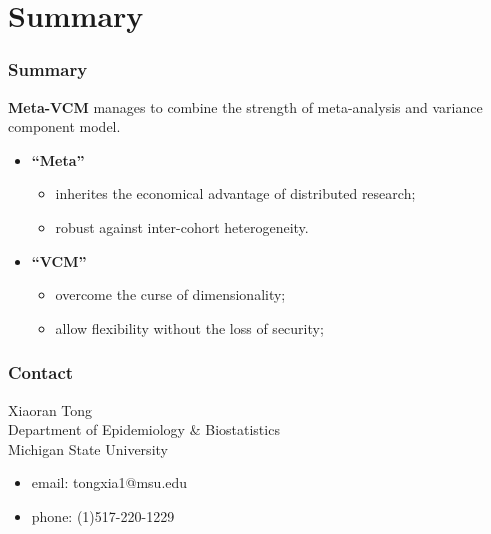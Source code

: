 \documentclass{beamer}
\begin{document}
\section{Summary}
\begin{frame} %
  \frametitle{Summary} %
  \textbf{Meta-VCM} manages to combine the strength of meta-analysis and
  variance component model.
  \begin{itemize}
  \item \textbf{``Meta''}
    \begin{itemize}
    \item inherites the economical advantage of distributed research;
    \item robust against inter-cohort heterogeneity.
    \end{itemize}
  \item \textbf{``VCM''}
    \begin{itemize}
    \item overcome the curse of dimensionality;
    \item allow flexibility without the loss of security;
    \end{itemize}
  \end{itemize}
\end{frame}
\begin{frame} %
  \frametitle{Contact} %
  Xiaoran Tong \\
  Department of Epidemiology \& Biostatistics \\
  Michigan State University
  \begin{itemize}
  \item email: tongxia1@msu.edu
  \item phone: (1)517-220-1229
  \end{itemize}
\end{frame}
\end{document}

